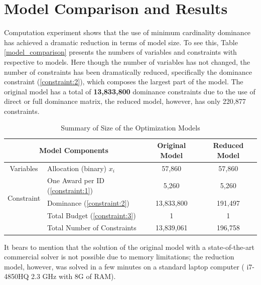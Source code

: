\documentclass[12pt,english]{report}
\begin{document}
\section{Model Comparison and Results}
Computation experiment shows that the use of minimum cardinality dominance has
achieved
a dramatic reduction in terms of model size.  To see this, Table
\ref{model_comparison}
presents the numbers of variables and constraints with respective to models.
Here though
the number of variables has not changed, the number of constraints has been
dramatically 
reduced, specifically the dominance constraint (\ref{constraint:2}), which
composes the 
largest part of the model. The original model has a total of
\textbf{13,833,800} dominance
constraints due to the use of direct or full dominance matrix, the reduced
model, however,
has only 220,877 constraints.

\begin{table}[]
\centering
\begin{tabular}{|c|l|c|c|}
\hline
\multicolumn{2}{|c|}{Model Components}                                        &
Original Model & Reduced Model \\ \hline
Variables                   & \multicolumn{1}{|l|}{Allocation (binary)  $x_i$}
& 57,860         & 57,860        \\ \hline
\multirow{3}{*}{Constraint} & One Award per ID  (\ref{constraint:1})        &
5,260          & 5,260         \\ \cline{2-4}
& Dominance  (\ref{constraint:2})               & 13,833,800     & 191,497
\\ \cline{2-4}
& Total Budget   (\ref{constraint:3})           & 1              & 1
\\ \cline{2-4}
& Total Number of Constraints                   & 13,839,061     & 196,758
\\ \hline
\end{tabular}
\caption{Summary of Size of the Optimization Models }
\label{model_comparison}
\label{size_model}
\end{table}

It bears to mention that the solution of the original model with a
state-of-the-art 
commercial solver is not possible due to memory limitations; the reduction
model, however,
was solved in a few minutes on a standard laptop computer ( i7-4850HQ 2.3 GHz
with 8G of RAM).
\end{document}
